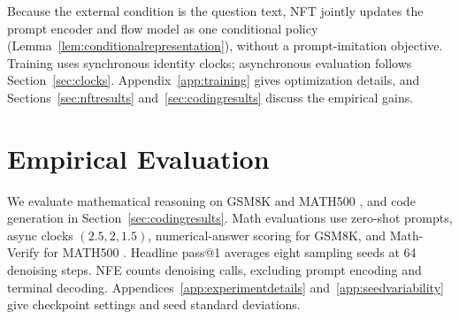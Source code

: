 \documentclass{article}
\begin{document}
Because the external condition is the question text, NFT jointly updates the prompt encoder and flow model as one conditional policy (Lemma~\ref{lem:conditionalrepresentation}), without a prompt-imitation objective. Training uses synchronous identity clocks; asynchronous evaluation follows Section~\ref{sec:clocks}. Appendix~\ref{app:training} gives optimization details, and Sections~\ref{sec:nftresults} and~\ref{sec:codingresults} discuss the empirical gains.

\section{Empirical Evaluation}
\label{sec:headlineresults}

We evaluate mathematical reasoning on GSM8K and MATH500 \citep{gsm8k,math,math500}, and code generation in Section~\ref{sec:codingresults}. Math evaluations use zero-shot prompts, async clocks $(2.5,2,1.5)$, numerical-answer scoring for GSM8K, and Math-Verify for MATH500 \citep{mathverify}. Headline pass@1 averages eight sampling seeds at 64 denoising steps. NFE counts denoising calls, excluding prompt encoding and terminal decoding. Appendices~\ref{app:experimentdetails} and~\ref{app:seedvariability} give checkpoint settings and seed standard deviations.
\end{document}
